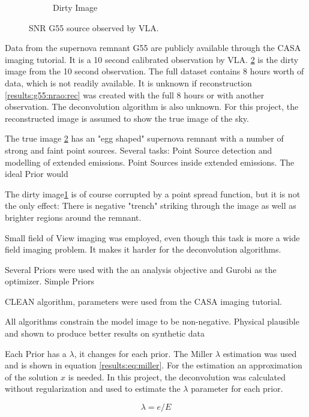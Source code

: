 \begin{figure}[h]
\begin{subfigure}[b]{0.45\linewidth}
		\caption{Dirty Image}
		\label{results:g55:nrao:dirty}
	\end{subfigure}
	\caption{SNR G55 source observed by VLA.}
	\label{results:g55:nrao}
\end{figure}

Data from the supernova remnant G55 are publicly available through the CASA imaging tutorial\cite{casaImagingGuide}. It is a 10 second calibrated observation by VLA. \ref{results:g55:nrao} is the dirty image from the 10 second observation. The full dataset contains 8 hours worth of data, which is not readily available. It is unknown if reconstruction \ref{results:g55:nrao:rec} was created with the full 8 hours or with another observation. The deconvolution algorithm is also unknown. For this project, the reconstructed image is assumed to show the true image of the sky.

The true image \ref{results:g55:nrao} has an "egg shaped" supernova remnant with a number of strong and faint point sources. Several tasks: Point Source detection and modelling of extended emissions. Point Sources inside extended emissions. The ideal Prior would

The dirty image\ref{results:g55:nrao:dirty} is of course corrupted by a point spread function, but it is not the only effect: There is negative "trench" striking through the image as well as brighter regions around the remnant.

Small field of View imaging was employed, even though this task is more a wide field imaging problem. It makes it harder for the deconvolution algorithms.

Several Priors were used with the an analysis objective and Gurobi as the optimizer.
Simple Priors


CLEAN algorithm, parameters were used from the CASA imaging tutorial. 

All algorithms constrain the model image to be non-negative. Physical plausible and shown to produce better results on synthetic data\cite{mcewen2011compressed}

Each Prior has a $\lambda$, it changes for each prior. The Miller\cite{miller1970least} $\lambda$ estimation was used and is shown in equation \eqref{results:eq:miller}. For the estimation an approximation of the solution $x$ is needed. In this project, the deconvolution was calculated without regularization and used to estimate the $\lambda$ parameter for each prior.

\begin{equation}\label{results:eq:miller}
	\lambda = e / E
\end{equation}

